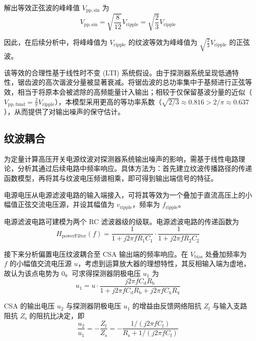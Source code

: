 \documentclass[12pt,fontset=fandol]{ctexart}
\begin{document}
解出等效正弦波的峰峰值 $V_{\mathrm{pp,sin}}$ 为
\begin{equation}
V_{\mathrm{pp,sin}} = \sqrt{\frac{8}{12}}V_{\mathrm{ripple}} = \sqrt{\frac{2}{3}}V_{\mathrm{ripple}}
\end{equation}

因此，在后续分析中，将峰峰值为 $V_{\mathrm{ripple}}$ 的纹波等效为峰峰值为 $\sqrt{\frac{2}{3}}V_{\mathrm{ripple}}$ 的正弦波。

\begin{graycommentblock}
该等效的合理性基于线性时不变 (LTI) 系统假设。由于探测器系统呈现低通特性，锯齿波的高次谐波分量被显著衰减。将锯齿波的总功率集中于基频进行正弦等效，相当于将原本会被滤除的高频能量计入输出；相较于仅保留基波分量的近似（$V_{\mathrm{pp,fund}}=\frac{2}{\pi}V_{\mathrm{ripple}}$），本模型采用更高的等功率系数（$\sqrt{2/3}\approx 0.816 > 2/\pi \approx 0.637$），从而提供了对输出噪声的保守估计\cite{ref13}。
\end{graycommentblock}

\subsection{纹波耦合}

为定量计算高压开关电源纹波对探测器系统输出噪声的影响，需基于线性电路理论，分析其通过后续电路中频率响应\cite{ref13}。具体方法为：首先建立纹波传播路径的传递函数模型，再将其与纹波电压频谱相乘，即可得到输出端信号的特征。

电源电压从电源滤波电路的输入端接入，可将其等效为一个叠加于直流高压上的小幅值正弦交流电压源，并设其幅值为 $v_{\mathrm{ripple}}$，频率为 $f_{\mathrm{ripple}}$。

电源滤波电路可建模为两个 RC 滤波器级的级联。电源滤波电路的传递函数为
\begin{equation}
H_{\mathrm{powerFilter}}(f) = \frac{1}{1 + j2\pi f R_1 C_1} \cdot \frac{1}{1 + j2\pi f R_2 C_2}
\end{equation}

接下来分析偏置电压纹波耦合至 CSA 输出端的频率响应。在 $V_{\mathrm{bias}}$ 处叠加频率为 $f$ 的小幅值交流电压源 $u$，考虑到运算放大器的理想特性，其反相输入端为虚地，故认为该点电势为 0。可求得探测器阴极电压 $u_1$ 为
\begin{equation}
u_1 = u \cdot \frac{j2\pi f C_{\mathrm{d}} R_{\mathrm{b}}}{1 + j2\pi f C_{\mathrm{d}} R_{\mathrm{b}} + j2\pi f C_{\mathrm{x}} R_{\mathrm{x}}}
\end{equation}

CSA 的输出电压 $u_2$ 与探测器阴极电压 $u_{1}$ 的增益由反馈网络阻抗 $Z_{\mathrm{f}}$ 与输入支路阻抗 $Z_{\mathrm{s}}$ 的阻抗比决定，即
\begin{equation}
\frac{u_2}{u_1} = -\frac{Z_{\mathrm{f}}}{Z_{\mathrm{s}}} = - \frac{1 / (j2\pi f C_{\mathrm{f}})}{R_{\mathrm{s}} + 1/(j2\pi f C_{\mathrm{f}})}
\end{equation}
\end{document}
